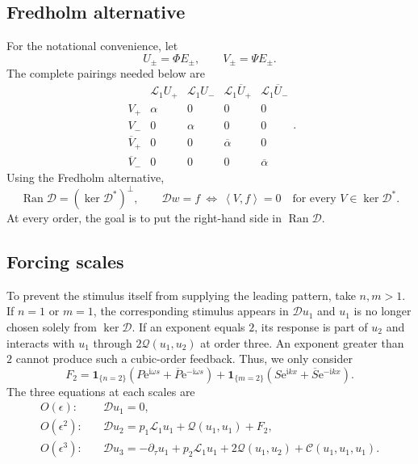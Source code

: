 \documentclass[11pt]{article}
\newcommand{\ii}{\mathrm{i}}
\newcommand{\ee}{\mathrm{e}}
\newcommand{\cQ}{\mathcal{Q}}
\newcommand{\cC}{\mathcal{C}}
\newcommand{\cL}{\mathcal{L}}
\newcommand{\cD}{\mathcal{D}}
\newcommand{\ip}[2]{\left\langle #1,#2\right\rangle}
\newcommand{\one}[1]{\bm{1}_{\{#1\}}}
\begin{document}
\subsection{Fredholm alternative}
 For the notational convenience, let
\begin{equation}
 U_\pm=\Phi E_\pm,
 \qquad V_\pm=\Psi E_\pm.
\end{equation}
The complete pairings needed below are
\begin{equation}
\begin{array}{c|cccc}
 &\cL_1U_+&\cL_1U_-&\cL_1\overline U_+&\cL_1\overline U_-\\ \hline
 V_+&\alpha&0&0&0\\
 V_-&0&\alpha&0&0\\
 \overline V_+&0&0&\overline\alpha&0\\
 \overline V_-&0&0&0&\overline\alpha
\end{array}.
 \label{eq:L1-pairing-table}
\end{equation}
Using the Fredholm alternative, 
\begin{equation}
 \operatorname{Ran}\cD=(\ker\cD^*)^\perp,
 \qquad
 \cD w=f\ \Longleftrightarrow\
 \ip{V}{f}=0\quad\text{for every }V\in\ker\cD^*.
 \label{eq:fredholm}
\end{equation}
At every order, the goal is to put the right-hand side in
$\operatorname{Ran}\cD$.

\subsection{Forcing scales}
To prevent the stimulus itself from supplying the leading pattern, take
$n,m>1$.  If $n=1$ or $m=1$, the corresponding stimulus appears in
$\cD u_1$ and $u_1$ is no longer chosen solely from $\ker\cD$.  If an
exponent equals $2$, its response is part of $u_2$ and interacts with $u_1$
through $2\cQ(u_1,u_2)$ at order three.  An exponent greater than $2$ cannot
produce such a cubic-order feedback. Thus, we only consider
\begin{equation}
    F_2=\one{n=2}
 \left(P\ee^{\ii\omega s}+\overline P\ee^{-\ii\omega s}\right)
 +\one{m=2}
 \left(S\ee^{\ii kx}+\overline S\ee^{-\ii kx}\right).
 \label{eq:F2}
\end{equation}
The three equations at each scales are
\begin{subequations}
\label{eq:three-orders}
\begin{align}
 O(\epsilon):\quad
 &\cD u_1=0,
 \label{eq:order1}\\
 O(\epsilon^2):\quad
 &\cD u_2=p_1\cL_1u_1+\cQ(u_1,u_1)+F_2,
 \label{eq:order2}\\
 O(\epsilon^3):\quad
 &\cD u_3=-\partial_\tau u_1+p_2\cL_1u_1
 +2\cQ(u_1,u_2)+\cC(u_1,u_1,u_1).
 \label{eq:order3}
\end{align}
\end{subequations}
\end{document}

